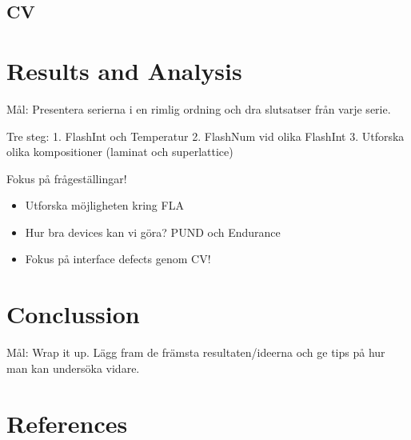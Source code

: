 \documentclass[11pt]{article}
\begin{document}
        \subsection{CV}


    \section{Results and Analysis}

    Mål: Presentera serierna i en rimlig ordning och dra slutsatser från varje serie.

    Tre steg: 1. FlashInt och Temperatur 2. FlashNum vid olika FlashInt 3. Utforska olika kompositioner (laminat och superlattice)

    Fokus på frågeställingar!
    \begin{itemize}
        \item Utforska möjligheten kring FLA
        \item Hur bra devices kan vi göra? PUND och Endurance
        \item Fokus på interface defects genom CV!\  
    \end{itemize}

    \section{Conclussion}

    Mål: Wrap it up. Lägg fram de främsta resultaten/ideerna och ge tips på hur man kan undersöka vidare.

    \section{References}
        
        
\end{document}
